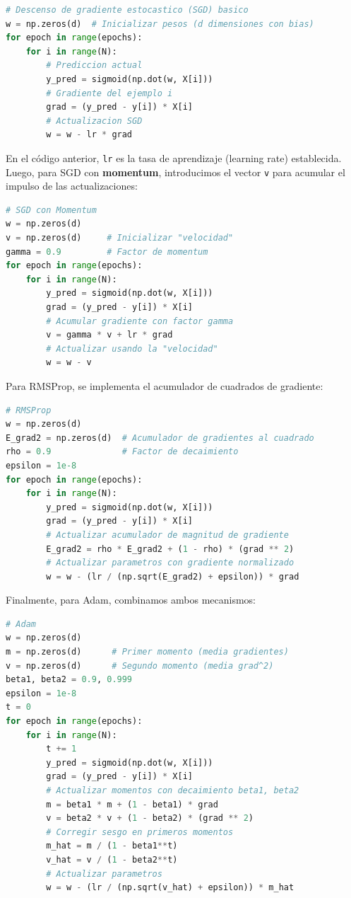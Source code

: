 \documentclass[12pt, spanish]{article}
\begin{document}
\begin{lstlisting}[language=Python, caption={Implementación de SGD basico}, label=code:sgd]
# Descenso de gradiente estocastico (SGD) basico
w = np.zeros(d)  # Inicializar pesos (d dimensiones con bias)
for epoch in range(epochs):
    for i in range(N):
        # Prediccion actual
        y_pred = sigmoid(np.dot(w, X[i]))
        # Gradiente del ejemplo i
        grad = (y_pred - y[i]) * X[i]
        # Actualizacion SGD
        w = w - lr * grad
\end{lstlisting}

En el código anterior, \texttt{lr} es la tasa de aprendizaje (learning rate) establecida. Luego, para SGD con \textbf{momentum}, introducimos el vector \texttt{v} para acumular el impulso de las actualizaciones:

\begin{lstlisting}[language=Python, caption={Implementación de SGD con Momentum}, label=code:momentum]
# SGD con Momentum
w = np.zeros(d)
v = np.zeros(d)     # Inicializar "velocidad"
gamma = 0.9         # Factor de momentum
for epoch in range(epochs):
    for i in range(N):
        y_pred = sigmoid(np.dot(w, X[i]))
        grad = (y_pred - y[i]) * X[i]
        # Acumular gradiente con factor gamma
        v = gamma * v + lr * grad
        # Actualizar usando la "velocidad"
        w = w - v
\end{lstlisting}

Para RMSProp, se implementa el acumulador de cuadrados de gradiente:

\begin{lstlisting}[language=Python, caption={Implementación de RMSProp}, label=code:rmsprop]
# RMSProp
w = np.zeros(d)
E_grad2 = np.zeros(d)  # Acumulador de gradientes al cuadrado
rho = 0.9              # Factor de decaimiento
epsilon = 1e-8
for epoch in range(epochs):
    for i in range(N):
        y_pred = sigmoid(np.dot(w, X[i]))
        grad = (y_pred - y[i]) * X[i]
        # Actualizar acumulador de magnitud de gradiente
        E_grad2 = rho * E_grad2 + (1 - rho) * (grad ** 2)
        # Actualizar parametros con gradiente normalizado
        w = w - (lr / (np.sqrt(E_grad2) + epsilon)) * grad
\end{lstlisting}

Finalmente, para Adam, combinamos ambos mecanismos:

\begin{lstlisting}[language=Python, caption={Implementación de Adam}, label=code:adam]
# Adam
w = np.zeros(d)
m = np.zeros(d)      # Primer momento (media gradientes)
v = np.zeros(d)      # Segundo momento (media grad^2)
beta1, beta2 = 0.9, 0.999
epsilon = 1e-8
t = 0
for epoch in range(epochs):
    for i in range(N):
        t += 1
        y_pred = sigmoid(np.dot(w, X[i]))
        grad = (y_pred - y[i]) * X[i]
        # Actualizar momentos con decaimiento beta1, beta2
        m = beta1 * m + (1 - beta1) * grad
        v = beta2 * v + (1 - beta2) * (grad ** 2)
        # Corregir sesgo en primeros momentos
        m_hat = m / (1 - beta1**t)
        v_hat = v / (1 - beta2**t)
        # Actualizar parametros
        w = w - (lr / (np.sqrt(v_hat) + epsilon)) * m_hat
\end{lstlisting}
\end{document}
